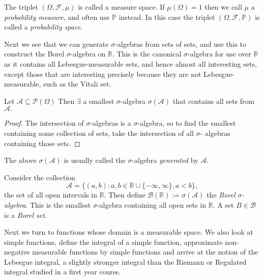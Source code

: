 \begin{remark}
    The triplet $(\Omega,\mathcal{F},\mu)$ is called a measure space. If $\mu(\Omega)
    =1$ then we call $\mu$ a \emph{probability measure}, and often use $\mathbb{P}$ 
    instead. In this case the triplet $(\Omega,\mathcal{F},\mathbb{P})$ is called a 
    \emph{probability space}.
\end{remark}

Next we see that we can generate $\sigma$-algebras from sets of sets, and use 
this to construct the Borel $\sigma$-algebra on $\mathbb{R}$. This is the canonical
$\sigma$-algebra for use over $\mathbb{R}$ as it contains all Lebesgue-measurable 
sets, and hence almost all interesting sets, except those that are interesting 
precisely because they are not Lebesgue-measurable, such as the Vitali set.

\begin{lemma}
    Let $\mathcal{A}\subseteq\mathcal{P}(\Omega)$ Then $\exists$ a smallest $\sigma$-algebra 
    $\sigma(\mathcal{A})$ that contains all sets from $\mathcal{A}.$
\end{lemma}
\begin{proof}
    The intersection of $\sigma$-algebras is a $\sigma$-algebra, so to find the 
    smallest containing some collection of sets, take the intersection of all $\sigma$-
    algebras containing those sets.
\end{proof}

\begin{remark}
    The above $\sigma(\mathcal{A})$ is usually called the $\sigma$-algebra
    \emph{generated} by $\mathcal{A}$.
\end{remark}

\begin{definition}
    Consider the collection 
    \begin{equation*}
        \mathcal{A}=\{(a,b):a,b\in\mathbb{R}\cup\{-\infty,\infty\},a<b\},
    \end{equation*}
    the set of all open intervals in $\mathbb{R}$. Then define 
    $\mathcal{B}(\mathbb{R}):=\sigma(\mathcal{A})$ the \emph{Borel 
    $\sigma$-algebra}. This is the smallest $\sigma$-algebra containing all open
    sets in $\mathbb{R}$. A set $B\in\mathcal{B}$ is a \emph{Borel set}.
\end{definition}

Next we turn to functions whose domain is a measurable space. We also look at simple 
functions, define the integral of a simple function, approximate non-negative measurable
functions by simple functions and arrive at the notion of the Lebesgue integral, a slightly
stronger integral than the Riemann or Regulated integral studied in a first year course.

